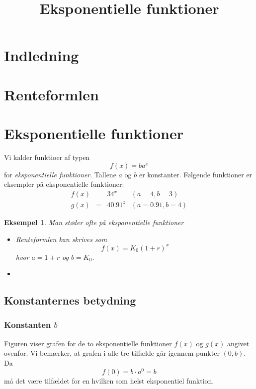 \documentclass[12pt,oneside,a4paper]{article}
\title{Eksponentielle funktioner}
\newtheorem{eks}[thm]{Eksempel}
\begin{document}
\maketitle

\section{Indledning}
\section{Renteformlen}
\section{Eksponentielle funktioner}
Vi kalder funktioer af typen
$$
f(x) = ba^x
$$
for {\em eksponentielle funktioner}. Tallene $a$ og $b$ er konstanter. Følgende funktioner er 
eksempler på eksponentielle funktioner:
$$
\begin{array}{rcll}
    f(x) &=& 3 4^x & (a=4, b=3) \\
    g(x) &=& 4 0.91^z & (a=0.91, b=4) 
\end{array}
$$

\begin{eks}
    Man støder ofte på eksponentielle funktioner
    \begin{itemize}
        \item Renteformlen kan skrives som
            $$
            f(x) = K_0 (1+r)^x
            $$
            hvor $a=1+r$ og $b=K_0$.
        \item 
    \end{itemize}
\end{eks}

\subsection{Konstanternes betydning}
\subsubsection{Konstanten $b$}
Figuren viser grafen for de to eksponentielle funktioner $f(x)$ og $g(x)$
angivet ovenfor. Vi bemærker, at grafen i alle tre tilfælde går igennem punkter $(0, b)$.
Da
$$
f(0) = b\cdot a^0 = b
$$
må det være tilfældet for en hvilken som helst eksponentiel funktion.
\end{document}
